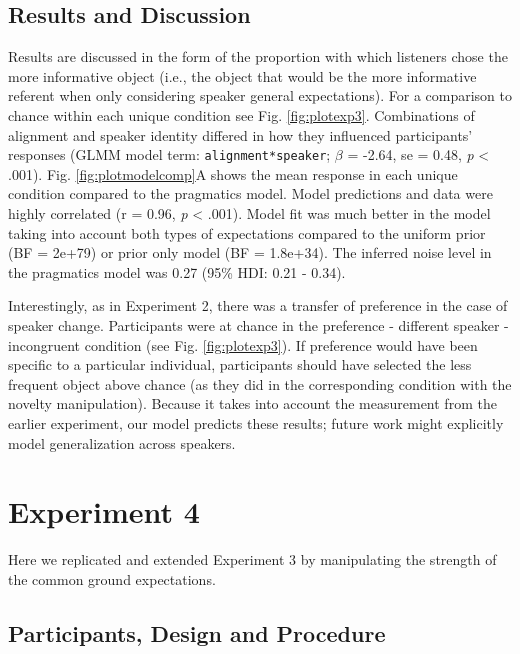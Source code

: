 \documentclass[10pt, letterpaper]{article}
\begin{document}
\subsection{Results and Discussion}\label{results-and-discussion-2}

Results are discussed in the form of the proportion with which listeners
chose the more informative object (i.e., the object that would be the
more informative referent when only considering speaker general
expectations). For a comparison to chance within each unique condition
see Fig. \ref{fig:plotexp3}. Combinations of alignment and speaker
identity differed in how they influenced participants' responses (GLMM
model term: \texttt{alignment*speaker}; \(\beta\) = -2.64, se = 0.48,
\emph{p} \textless{} .001). Fig. \ref{fig:plotmodelcomp}A shows the mean
response in each unique condition compared to the pragmatics model.
Model predictions and data were highly correlated (r = 0.96, \emph{p}
\textless{} .001). Model fit was much better in the model taking into
account both types of expectations compared to the uniform prior (BF =
2e+79) or prior only model (BF = 1.8e+34). The inferred noise level in
the pragmatics model was 0.27 (95\% HDI: 0.21 - 0.34).

Interestingly, as in Experiment 2, there was a transfer of preference in
the case of speaker change. Participants were at chance in the
preference - different speaker - incongruent condition (see Fig.
\ref{fig:plotexp3}). If preference would have been specific to a
particular individual, participants should have selected the less
frequent object above chance (as they did in the corresponding condition
with the novelty manipulation). Because it takes into account the
measurement from the earlier experiment, our model predicts these
results; future work might explicitly model generalization across
speakers.

\section{Experiment 4}\label{experiment-4}

Here we replicated and extended Experiment 3 by manipulating the
strength of the common ground expectations.

\subsection{Participants, Design and
Procedure}\label{participants-design-and-procedure-3}
\end{document}
